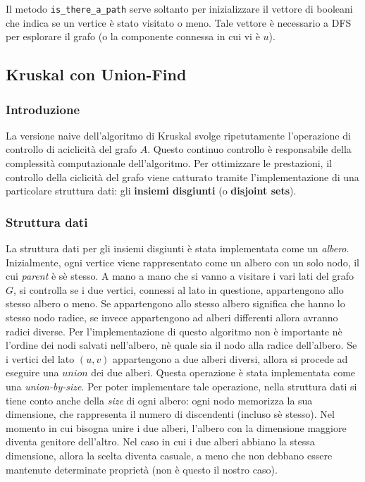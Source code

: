 Il metodo \verb|is_there_a_path| serve soltanto per inizializzare
il vettore di booleani che indica se un vertice è stato visitato o meno.
Tale vettore è necessario a DFS per esplorare il grafo (o la
componente connessa in cui vi è $u$).

\subsection{Kruskal con Union-Find}

\subsubsection{Introduzione}

La versione naive dell'algoritmo di Kruskal svolge ripetutamente
l'operazione di controllo di aciclicità del grafo $A$. Questo continuo
controllo è responsabile della complessità computazionale
dell'algoritmo. Per ottimizzare le prestazioni, il controllo della
ciclicità del grafo viene catturato tramite l'implementazione di
una particolare struttura dati: gli \textbf{insiemi disgiunti}
(o \textbf{disjoint sets}).

\subsubsection{Struttura dati}

La struttura dati per gli insiemi disgiunti è stata implementata
come un \textit{albero}. Inizialmente, ogni vertice viene
rappresentato come un albero con un solo nodo, il cui \textit{parent}
è sè stesso. A mano a mano che si vanno a visitare i vari lati del
grafo $G$, si controlla se i due vertici, connessi al lato in questione,
appartengono allo stesso albero o meno. Se appartengono allo stesso
albero significa che hanno lo stesso nodo radice, se invece appartengono
ad alberi differenti allora avranno radici diverse. Per
l'implementazione di questo algoritmo non è importante nè l'ordine dei
nodi salvati nell'albero, nè quale sia il nodo alla radice dell'albero.
Se i vertici del lato $(u, v)$ appartengono a due alberi diversi,
allora si procede ad eseguire una $union$ dei due alberi. Questa
operazione è stata implementata come una \textit{union-by-size}.
Per poter implementare tale operazione, nella struttura dati si tiene
conto anche della \textit{size} di ogni albero: ogni nodo memorizza
la sua dimensione, che rappresenta il numero di discendenti (incluso
sè stesso). Nel momento in cui bisogna unire i due alberi, l'albero
con la dimensione maggiore diventa genitore dell'altro. Nel caso in
cui i due alberi abbiano la stessa dimensione, allora la scelta
diventa casuale, a meno che non debbano essere mantenute determinate
proprietà (non è questo il nostro caso).

